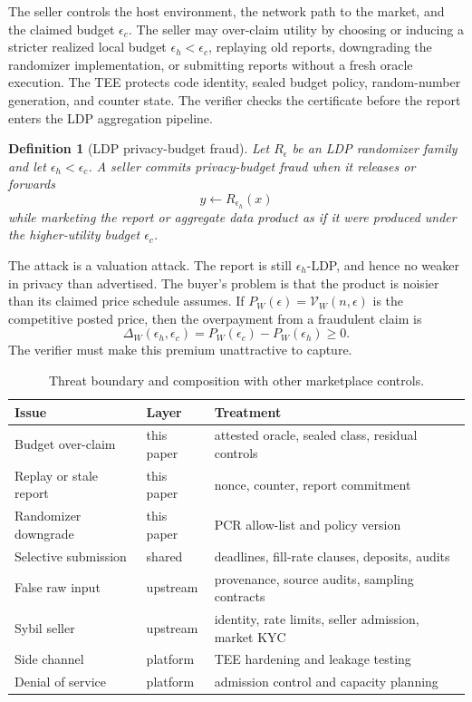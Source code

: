 \documentclass[conference]{IEEEtran}
\newtheorem{definition}{Definition}[section]
\newcommand{\eps}{\epsilon}
\newcommand{\V}{\mathscr{V}}
\begin{document}
The seller controls the host environment, the network path to the market, and the claimed budget $\eps_c$. The seller may over-claim utility by choosing or inducing a stricter realized local budget $\eps_h<\eps_c$, replaying old reports, downgrading the randomizer implementation, or submitting reports without a fresh oracle execution. The TEE protects code identity, sealed budget policy, random-number generation, and counter state. The verifier checks the certificate before the report enters the LDP aggregation pipeline.

\begin{definition}[LDP privacy-budget fraud]
\label{def:fraud}
Let $R_\eps$ be an LDP randomizer family and let $\eps_h<\eps_c$. A seller commits privacy-budget fraud when it releases or forwards
\[
y\leftarrow R_{\eps_h}(x)
\]
while marketing the report or aggregate data product as if it were produced under the higher-utility budget $\eps_c$.
\end{definition}

The attack is a valuation attack. The report is still $\eps_h$-LDP, and hence no weaker in privacy than advertised. The buyer's problem is that the product is noisier than its claimed price schedule assumes. If $P_W(\eps)=\V_W(n,\eps)$ is the competitive posted price, then the overpayment from a fraudulent claim is
\[
\Delta_W(\eps_h,\eps_c)=P_W(\eps_c)-P_W(\eps_h)\ge 0.
\]
The verifier must make this premium unattractive to capture.

\begin{table}[t]
\caption{Threat boundary and composition with other marketplace controls.}
\label{tab:threat-boundary}
\centering
\scriptsize
\begin{tabularx}{\columnwidth}{p{}p{}X}
\toprule
Issue & Layer & Treatment \\
\midrule
Budget over-claim & this paper & attested oracle, sealed class, residual controls \\
Replay or stale report & this paper & nonce, counter, report commitment \\
Randomizer downgrade & this paper & PCR allow-list and policy version \\
Selective submission & shared & deadlines, fill-rate clauses, deposits, audits \\
False raw input & upstream & provenance, source audits, sampling contracts \\
Sybil seller & upstream & identity, rate limits, seller admission, market KYC \\
Side channel & platform & TEE hardening and leakage testing \\
Denial of service & platform & admission control and capacity planning \\
\bottomrule
\end{tabularx}
\end{table}
\end{document}

